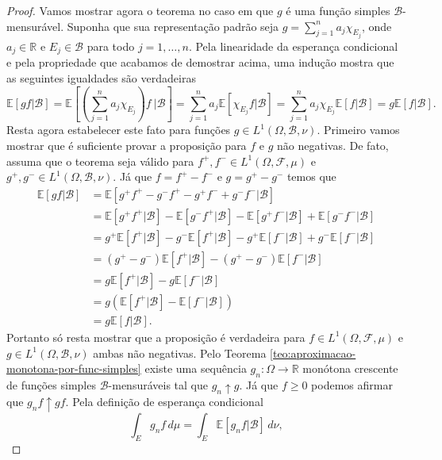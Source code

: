 \begin{proof}
Vamos mostrar agora o teorema no caso em que $g$ 
é uma função simples $\mathcal{B}$-mensurável. 
Suponha que sua representação padrão seja 
$g = \sum_{j=1}^n a_j \chi_{E_j}$, 
onde $a_j\in\mathbb{R}$ e $E_j\in \mathcal{B}$ 
para todo $j=1,\ldots,n$.
Pela linearidade da esperança condicional e pela 
propriedade que acabamos de demostrar acima, 
uma indução mostra que as seguintes igualdades 
são verdadeiras
\[
\mathbb{E}[gf|\mathcal{B}]
=
\mathbb{E}\left[\left(\sum_{j=1}^n a_j \chi_{E_j}\right)
f\ \Big|\mathcal{B}\right]
=
\sum_{j=1}^n a_j \mathbb{E}[\chi_{E_j}f|\mathcal{B}]
=
\sum_{j=1}^n a_j\chi_{E_j} \mathbb{E}[f|\mathcal{B}]
=
g\mathbb{E}[f|\mathcal{B}].
\]
Resta agora estabelecer este fato para funções 
$g\in L^1(\Omega,\mathcal{B},\nu)$. 
Primeiro vamos mostrar que 
é suficiente provar a proposição para $f$ e $g$ não negativas. 
De fato, assuma que o teorema seja válido para 
$f^+,f^-\in L^1(\Omega,\mathcal{F},\mu)$ e 
$g^+,g^-\in L^1(\Omega,\mathcal{B},\nu)$. 
Já que $f=f^+-f^-$ e $g=g^+-g^-$
temos que 
\begin{align*}
	\mathbb{E}[gf|\mathcal{B}]
	&=
	\mathbb{E}[g^+f^+-g^-f^+-g^+f^-+g^-f^-|\mathcal{B}]
	\\[0.2cm]
	&= 
	\mathbb{E}[g^+f^+|\mathcal{B}]- \mathbb{E}[g^-f^+|\mathcal{B}] 
		-\mathbb{E}[g^+f^-|\mathcal{B}]+\mathbb{E}[g^-f^-|\mathcal{B}]
	\\[0.2cm]
	&= 
	g^+\mathbb{E}[f^+|\mathcal{B}]-g^-\mathbb{E}[f^+|\mathcal{B}]
	-g^+\mathbb{E}[f^-|\mathcal{B}]+g^-\mathbb{E}[f^-|\mathcal{B}]
	\\[0.2cm]
	&=
	(g^+-g^-)\mathbb{E}[f^+|\mathcal{B}]
	-(g^+-g^-)\mathbb{E}[f^-|\mathcal{B}]
	\\[0.2cm]
	&=
	g\mathbb{E}[f^+|\mathcal{B}]-g\mathbb{E}[f^-|\mathcal{B}]
	\\[0.2cm]
	&=
	g(\mathbb{E}[f^+|\mathcal{B}]-\mathbb{E}[f^-|\mathcal{B}])
	\\[0.2cm]
	&=
	g\mathbb{E}[f|\mathcal{B}].
\end{align*}
Portanto só resta mostrar que a proposição é verdadeira 
para $f\in L^1(\Omega,\mathcal{F},\mu)$ 
e $g\in L^1(\Omega,\mathcal{B},\nu)$ ambas não negativas. 
Pelo Teorema \ref{teo:aproximacao-monotona-por-func-simples} 
existe uma sequência $g_n:\Omega\to\mathbb{R}$ 
monótona crescente de funções simples $\mathcal{B}$-mensuráveis 
tal que $g_n\uparrow g$. Já que $f\geq 0$ 
podemos afirmar que $g_nf\uparrow gf$. 
Pela definição de esperança condicional 
%
%
\begin{equation}\label{eq:aux3-esp-cond}
\int_{E}g_nf\, d\mu 
= 
\int_{E} \mathbb{E}[g_nf|\mathcal{B}]\, d\nu,

\end{equation}
\end{proof}
